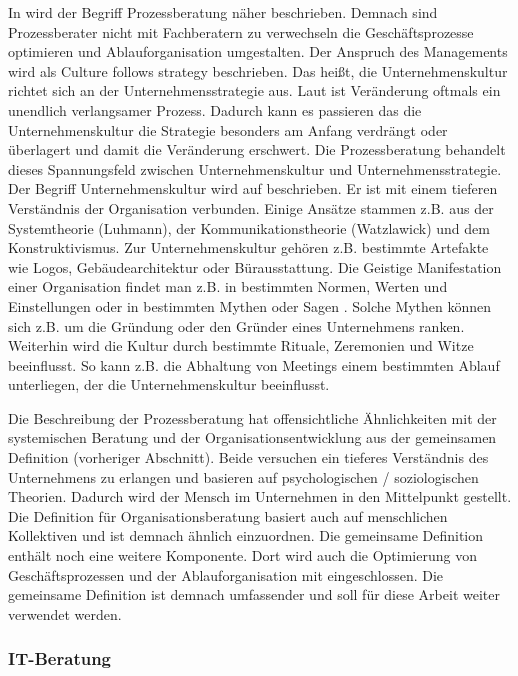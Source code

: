 In \cite[9]{HBProzess} wird der Begriff Prozessberatung näher beschrieben. Demnach sind Prozessberater nicht mit Fachberatern zu verwechseln die Geschäftsprozesse optimieren und Ablauforganisation umgestalten. Der Anspruch des Managements wird als \glqq Culture follows strategy \grqq beschrieben. Das heißt, die Unternehmenskultur richtet sich an der Unternehmensstrategie aus. Laut \cite[9]{HBProzess} ist Veränderung oftmals ein unendlich verlangsamer Prozess. Dadurch kann es passieren das die Unternehmenskultur die Strategie besonders am Anfang verdrängt oder überlagert und damit die Veränderung erschwert. Die Prozessberatung behandelt dieses Spannungsfeld zwischen Unternehmenskultur und Unternehmensstrategie.
Der Begriff Unternehmenskultur wird auf \cite[ Seite 9]{HBProzess} beschrieben. Er ist mit einem tieferen Verständnis der Organisation verbunden. Einige
Ansätze stammen z.B. aus der Systemtheorie (Luhmann), der Kommunikationstheorie (Watzlawick) und dem Konstruktivismus. Zur Unternehmenskultur gehören z.B. bestimmte Artefakte wie Logos, Gebäudearchitektur oder Bürausstattung. Die Geistige Manifestation einer Organisation findet man z.B. in bestimmten Normen, Werten und Einstellungen oder in bestimmten \glqq Mythen oder Sagen \grqq. Solche Mythen können sich z.B. um die Gründung oder den Gründer eines Unternehmens ranken. Weiterhin wird die Kultur durch bestimmte Rituale, Zeremonien und Witze beeinflusst. So kann z.B. die Abhaltung von Meetings einem bestimmten Ablauf unterliegen, der die Unternehmenskultur beeinflusst.

Die Beschreibung der Prozessberatung hat offensichtliche Ähnlichkeiten mit der systemischen Beratung und der Organisationsentwicklung aus der gemeinsamen Definition (vorheriger Abschnitt). Beide versuchen ein tieferes Verständnis des Unternehmens zu erlangen und basieren auf psychologischen / soziologischen Theorien. Dadurch wird der Mensch im Unternehmen in den Mittelpunkt gestellt.
Die Definition für Organisationsberatung basiert auch auf \grqq menschlichen Kollektiven \glqq und ist demnach ähnlich einzuordnen.
Die gemeinsame Definition enthält noch eine weitere Komponente. Dort wird auch die Optimierung von Geschäftsprozessen und der Ablauforganisation mit eingeschlossen. Die gemeinsame Definition ist demnach umfassender und soll für diese Arbeit weiter verwendet werden. 


\subsubsection*{IT-Beratung}
